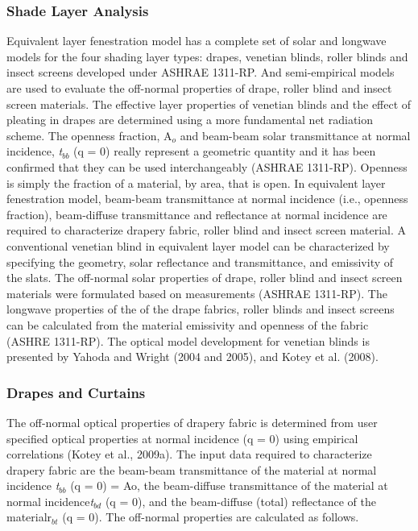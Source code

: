 \subsubsection{Shade Layer Analysis}\label{shade-layer-analysis}

Equivalent layer fenestration model has a complete set of solar and longwave models for the four shading layer types: drapes, venetian blinds, roller blinds and insect screens developed under ASHRAE 1311-RP. And semi-empirical models are used to evaluate the off-normal properties of drape, roller blind and insect screen materials. The effective layer properties of venetian blinds and the effect of pleating in drapes are determined using a more fundamental net radiation scheme. The openness fraction, A\(_{o}\) and beam-beam solar transmittance at normal incidence, \emph{t}\(_{bb}\) (q = 0) really represent a geometric quantity and it has been confirmed that they can be used interchangeably (ASHRAE 1311-RP). Openness is simply the fraction of a material, by area, that is open. In equivalent layer fenestration model, beam-beam transmittance at normal incidence (i.e., openness fraction), beam-diffuse transmittance and reflectance at normal incidence are required to characterize drapery fabric, roller blind and insect screen material. A conventional venetian blind in equivalent layer model can be characterized by specifying the geometry, solar reflectance and transmittance, and emissivity of the slats. The off-normal solar properties of drape, roller blind and insect screen materials were formulated based on measurements (ASHRAE 1311-RP). The longwave properties of the of the drape fabrics, roller blinds and insect screens can be calculated from the material emissivity and openness of the fabric (ASHRE 1311-RP). The optical model development for venetian blinds is presented by Yahoda and Wright (2004 and 2005), and Kotey et al. (2008).

\subsubsection{Drapes and Curtains}\label{drapes-and-curtains}

The off-normal optical properties of drapery fabric is determined from user specified optical properties at normal incidence (q = 0) using empirical correlations (Kotey et al., 2009a). The input data required to characterize drapery fabric are the beam-beam transmittance of the material at normal incidence \emph{t}\(_{bb}\) (q = 0) = Ao, the beam-diffuse transmittance of the material at normal incidence\emph{t}\(_{bd}\) (q = 0), and the beam-diffuse (total) reflectance of the materialr\(_{bt}\) (q = 0). The off-normal properties are calculated as follows.

